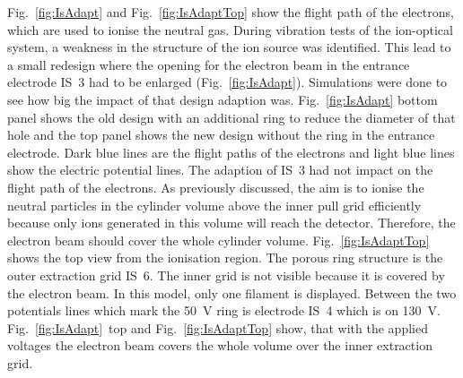 	Fig.~\ref{fig:IsAdapt} and Fig.~\ref{fig:IsAdaptTop} show the flight path of the electrons, which are used to ionise the neutral gas. During vibration tests of the ion-optical system, a weakness in the structure of the ion source was identified. This lead to a small redesign where the opening for the electron beam in the entrance electrode IS~3 had to be enlarged (Fig.~\ref{fig:IsAdapt}). Simulations were done to see how big the impact of that design adaption was. Fig.~\ref{fig:IsAdapt} bottom panel shows the old design with an additional ring to reduce the diameter of that hole and the top panel shows the new design without the ring in the entrance electrode. Dark blue lines are the flight paths of the electrons and light blue lines show the electric potential lines. The adaption of IS~3 had not impact on the flight path of the electrons. As previously discussed, the aim is to ionise the neutral particles in the cylinder volume above the inner pull grid efficiently because only ions generated in this volume will reach the detector. Therefore, the electron beam should cover the whole cylinder volume. Fig.~\ref{fig:IsAdaptTop} shows the top view from the ionisation region. The porous ring structure is the outer extraction grid IS~6. The inner grid is not visible because it is covered by the electron beam. In this model, only one filament is displayed. Between the two potentials lines which mark the 50~V ring is electrode IS~4 which is on 130~V. Fig.~\ref{fig:IsAdapt}~top and Fig.~\ref{fig:IsAdaptTop} show, that with the applied voltages the electron beam covers the whole volume over the inner extraction grid.
	
	
